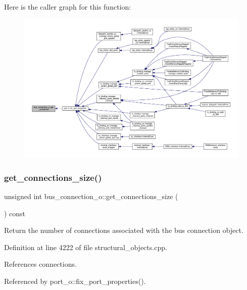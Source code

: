 Here is the caller graph for this function\+:
\nopagebreak
\begin{figure}[H]
\begin{center}
\leavevmode
\includegraphics[width=350pt]{d3/dfb/classbus__connection__o_acf9a1afb75c103ef417fdba4a87b2c0f_icgraph}
\end{center}
\end{figure}
\mbox{\label{classbus__connection__o_a33bc2eb332f138bce27623ab76ce1305}} 
\subsubsection{\texorpdfstring{get\+\_\+connections\+\_\+size()}{get\_connections\_size()}}
{\footnotesize\ttfamily unsigned int bus\+\_\+connection\+\_\+o\+::get\+\_\+connections\+\_\+size (\begin{DoxyParamCaption}{ }\end{DoxyParamCaption}) const}



Return the number of connections associated with the bus connection object. 



Definition at line 4222 of file structural\+\_\+objects.\+cpp.



References connections.



Referenced by port\+\_\+o\+::fix\+\_\+port\+\_\+properties().

